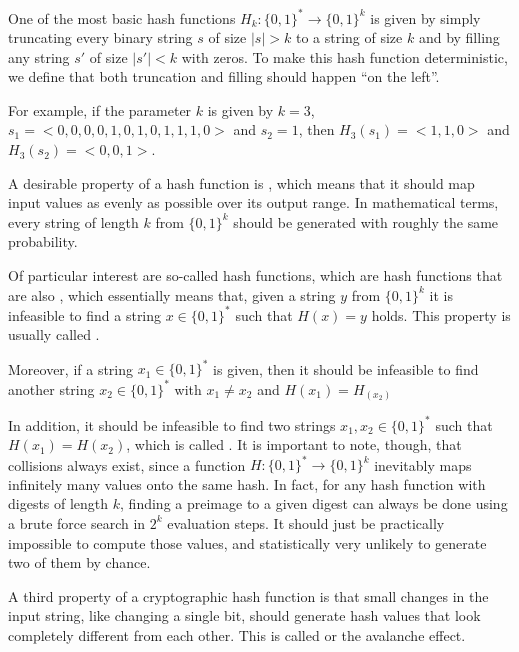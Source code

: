 \begin{example}\label{ex:k-truncation-hash} One of the most basic hash functions $H_k:\{0,1\}^*\to \{0,1\}^k$ is given by simply truncating every binary string $s$ of size $|s|> k$ to a string of size $k$ and by filling any string $s'$ of size $|s'|<k$ with zeros. To make this hash function deterministic, we define that both truncation and filling should happen ``on the left''.

For example, if the parameter $k$ is given by $k=3$, $s_1=<0,0,0,0,1,0,1,0,1,1,1,0>$ and $s_2=1$, then $H_3(s_1)=<1,1,0>$ and $H_3(s_2)=<0,0,1>$.
\end{example}

A desirable property of a hash function is , which means that it should map input values as evenly as possible over its output range. In mathematical terms, every string of length $k$  from $\{0,1\}^k$ should be generated with roughly the same probability.

Of particular interest are so-called  hash functions, which are hash functions that are also , which essentially means that, given a string $y$ from $\{0,1\}^k$ it is infeasible to find a string $x\in\{0,1\}^*$ such that $H(x)=y$ holds. This property is usually called .

Moreover, if a string $x_1\in\{0,1\}^*$ is given, then it should be infeasible to find another string $x_2\in\{0,1\}^*$ with $x_1\neq x_2$ and $H(x_1)=H_(x_2)$

In addition, it should be infeasible to find two strings $x_1,x_2 \in\{0,1\}^*$ such that $H(x_1)=H(x_2)$, which is called . It is important to note, though, that collisions always exist, since a function $H: \{0,1\}^* \to \{0,1\}^k$ inevitably maps infinitely many values onto the same hash. In fact, for any hash function with digests of length $k$, finding a preimage to a given digest can always be done using a brute force search in $2^k$ evaluation steps. It should just be practically impossible to compute those values, and statistically very unlikely to generate two of them by chance.

A third property of a cryptographic hash function is that small changes in the input string, like changing a single bit, should generate hash values that look completely different from each other. This is called  or the avalanche effect.

